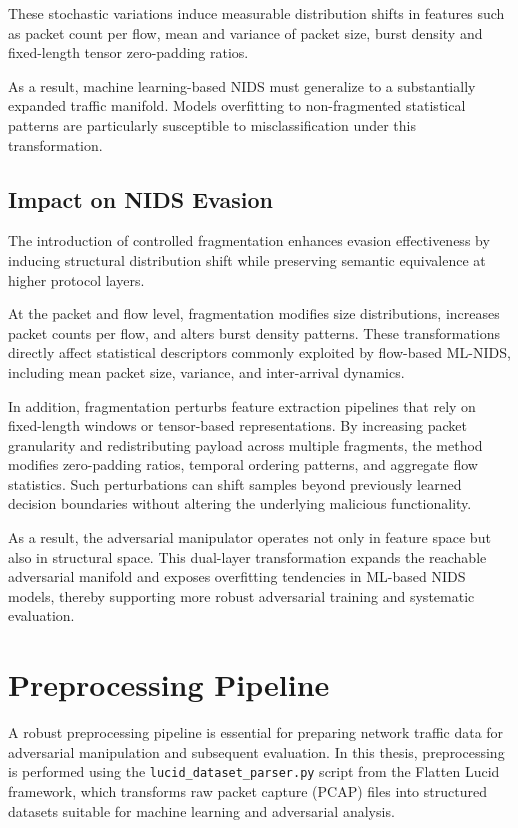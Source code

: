 These stochastic variations induce measurable distribution shifts in features such as packet count per flow, mean and variance of packet size, burst density and fixed-length tensor zero-padding ratios.

As a result, machine learning-based NIDS must generalize to a substantially expanded traffic manifold. Models overfitting to non-fragmented statistical patterns are particularly susceptible to misclassification under this transformation.

\subsection{Impact on NIDS Evasion}

The introduction of controlled fragmentation enhances evasion effectiveness by inducing structural distribution shift while preserving semantic equivalence at higher protocol layers.

At the packet and flow level, fragmentation modifies size distributions, increases packet counts per flow, and alters burst density patterns. These transformations directly affect statistical descriptors commonly exploited by flow-based ML-NIDS, including mean packet size, variance, and inter-arrival dynamics.

In addition, fragmentation perturbs feature extraction pipelines that rely on fixed-length windows or tensor-based representations. By increasing packet granularity and redistributing payload across multiple fragments, the method modifies zero-padding ratios, temporal ordering patterns, and aggregate flow statistics. Such perturbations can shift samples beyond previously learned decision boundaries without altering the underlying malicious functionality.

As a result, the adversarial manipulator operates not only in feature space but also in structural space. This dual-layer transformation expands the reachable adversarial manifold and exposes overfitting tendencies in ML-based NIDS models, thereby supporting more robust adversarial training and systematic evaluation.

\section{Preprocessing Pipeline}
\label{sec:preprocessing}

A robust preprocessing pipeline is essential for preparing network traffic data for adversarial manipulation and subsequent evaluation. In this thesis, preprocessing is performed using the \texttt{lucid\_dataset\_parser.py} script from the Flatten Lucid framework, which transforms raw packet capture (PCAP) files into structured datasets suitable for machine learning and adversarial analysis.

